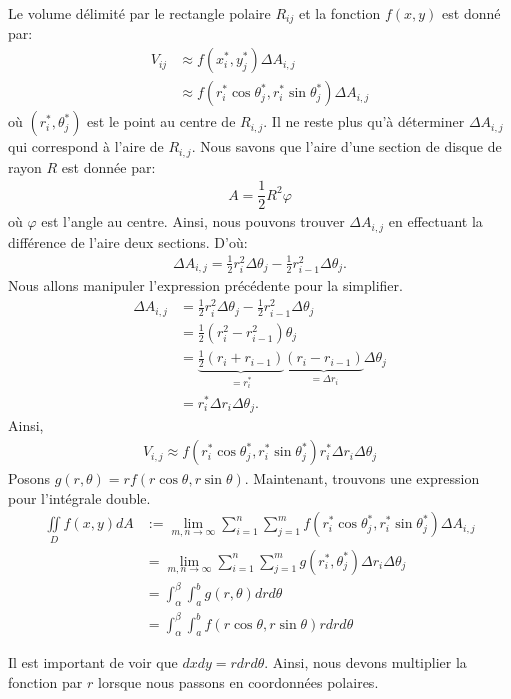 \documentclass[]{book}
\theoremstyle{definition}
\theoremstyle{definition}
\theoremstyle{definition}
\theoremstyle{remark}
\let\BeginKnitrBlock\begin \let\EndKnitrBlock\end
\begin{document}
Le volume délimité par le rectangle polaire \(R_{ij}\) et la fonction
\(f(x,y)\) est donné par: \begin{align*}
V_{ij}&\approx f(x_i^*,y_j^*)\Delta A_{i,j}\\
&\approx f(r_i^*\cos \theta_j^*,r_i^*\sin \theta_j^*)\Delta A_{i,j}
\end{align*} où \((r_i^*,\theta_j^*)\) est le point au centre de
\(R_{i,j}\). Il ne reste plus qu'à déterminer \(\Delta A_{i,j}\) qui
correspond à l'aire de \(R_{i,j}\). Nous savons que l'aire d'une section
de disque de rayon \(R\) est donnée par: \begin{align*}
A=\dfrac{1}{2}R^2\varphi
\end{align*} où \(\varphi\) est l'angle au centre. Ainsi, nous pouvons
trouver \(\Delta A_{i,j}\) en effectuant la différence de l'aire deux
sections. D'où: \begin{align*}
\Delta A_{i,j}= \frac{1}{2}r_i^2\Delta \theta_j-\frac{1}{2}r_{i-1}^2\Delta \theta_j.
\end{align*} Nous allons manipuler l'expression précédente pour la
simplifier. \begin{align*}
\Delta A_{i,j}&= \frac{1}{2}r_i^2\Delta \theta_j-\frac{1}{2}r_{i-1}^2\Delta \theta_j\\
&= \frac{1}{2}\left(r_i^2- r_{i-1}^2  \right)\theta_j\\
&= \underbrace{\frac{1}{2}(r_i+r_{i-1})}_{=r_i^*}\underbrace{(r_i-r_{i-1})}_{=\Delta r_i} \Delta \theta_j \\
&=r_i^*\Delta r_i\Delta \theta_j. 
\end{align*} Ainsi, \begin{align*}
V_{i,j}\approx f(r_i^*\cos \theta_j^*,r_i^*\sin \theta_j^*)r_i^*\Delta r_i\Delta \theta_j
\end{align*} Posons \(g(r,\theta)=rf(r\cos\theta, r\sin\theta)\).
Maintenant, trouvons une expression pour l'intégrale double.
\begin{align*}
\iint\limits_Df(x,y)dA&:=\lim_{m,n\to\infty }\sum_{i=1}^n\sum_{j=1}^mf(r_i^*\cos \theta_j^*,r_i^*\sin \theta_j^*)\Delta A_{i,j}\\
&=\lim_{m,n\to\infty }\sum_{i=1}^n\sum_{j=1}^mg(r_i^*,\theta_j^*)\Delta r_i\Delta \theta_j\\
&=\int_{\alpha }^{\beta }\int_{a }^{b }g(r,\theta)drd\theta\\
&=\int_{\alpha }^{\beta }\int_{a }^{b }f(r\cos\theta,r\sin\theta)rdrd\theta
\end{align*}

\BeginKnitrBlock{remark}
{}Il est important de voir que
\(dxdy=rdrd\theta\). Ainsi, nous devons multiplier la fonction par \(r\)
lorsque nous passons en coordonnées polaires.
\EndKnitrBlock{remark}
\end{document}
